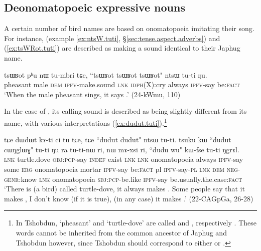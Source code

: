 \subsection{Deonomatopoeic expressive nouns} \label{sec:underived.expressive.nouns}
A certain number of bird names are based on onomatopoeia imitating their song. For instance,   (example \ref{ex:ntsW.tuti}, §\ref{sec:tense.aspect.adverbs})  and  (\ref{ex:tsWRot.tuti}) are described as making a sound identical to their Japhug name.

\begin{exe}
\ex \label{ex:tsWRot.tuti}
\gll  tsɯʁot pʰu nɯ tu-mbri tɕe, {``tsɯʁot tsɯʁot tsɯʁot"} ntsɯ tu-ti ŋu. \\
pheasant male \textsc{dem} \textsc{ipfv}-make.sound \textsc{lnk} \textsc{idph}(X):cry always \textsc{ipfv}-say  be:\textsc{fact} \\
\glt `When the male pheasant sings, it says .' (24-kWmu, 110)
\end{exe}

In the case of  , its calling sound is described as being slightly different from its name, with various interpretations (\ref{ex:dudut.tuti}).\footnote{In Tshobdun, `pheasant' and `turtle-dove' are called  and , respectively \citep[137]{jackson19tshobdun}. These words cannot be inherited from the common ancestor of Japhug and Tshobdun however, since Tshobdun  should correspond to either  or . }

\begin{exe}
\ex \label{ex:dudut.tuti}
\gll tɕe dɯdɯt kɤ-ti ci tu tɕe, tɕe {``dudut dudut"}  ntsɯ tu-ti. tsuku kɯ ``dudut cɯŋglɯɣ" tu-ti ŋu ra tu-ti-nɯ ri, nɯ mɤ-xsi ri, {``dudu wu"} kɯ-fse tu-ti ŋgrɤl. \\
\textsc{lnk} turtle.dove \textsc{obj}:\textsc{pcp}-say \textsc{indef} exist \textsc{lnk} \textsc{lnk} onomatopoeia always \textsc{ipfv}-say some \textsc{erg} onomatopoeia mortar \textsc{ipfv}-say  be:\textsc{fact} pl \textsc{ipfv}-say-\textsc{pl} \textsc{lnk} \textsc{dem} \textsc{neg}-\textsc{genr}:know \textsc{lnk} onomatopoeia \textsc{sbj}:\textsc{pcp}-be.like \textsc{ipfv}-say be.usually.the.case:\textsc{fact} \\
\glt `There is (a bird) called turtle-dove, it always makes . Some people say that it makes , I don't know (if it is true), (in any case) it makes .' (22-CAGpGa, 26-28)
\end{exe}

